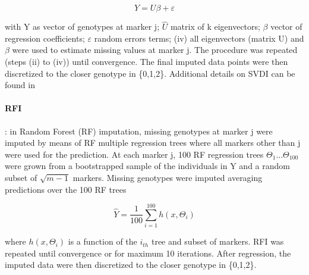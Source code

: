 \begin{equation}
\label{eq:SVDI_regression}
Y = U\beta +\varepsilon 
\end{equation}

with Y as vector of genotypes at marker j; $\hat{U}$ matrix of k eigenvectors; $\beta$ vector of regression coefficients; $\varepsilon$ random errors terms; (iv) all eigenvectors (matrix U) and $\beta$ were used to estimate missing values at marker j. The procedure was repeated (steps (ii) to (iv)) until convergence. The final imputed data points were then discretized to the closer genotype in \{0,1,2\}. Additional details on SVDI can be found in \cite{troyanskaya_missing_2001}

\paragraph{RFI}
\label{par:RFI}
: in Random Forest (RF) imputation, missing genotypes at marker j were imputed by means of RF multiple regression trees \cite{breiman_random_2001} where all markers other than j were used for the prediction. At each marker j, 100 RF regression trees $\Theta_{1} \ldots \Theta_{100}$ were grown from a bootstrapped sample of the individuals in Y and a random subset of $\sqrt{m-1}$ markers. Missing genotypes were imputed averaging predictions over the 100 RF trees

\begin{equation}
\label{eq:RFI_regression}
\hat{Y} = \frac{1}{100}\sum_{i=1}^{100} h(x,\Theta_i)
\end{equation}

where $h(x,\Theta_i)$ is a function of the $i_{th}$ tree and subset of markers. RFI was repeated until convergence or for maximum 10 iterations. After regression, the imputed data were then discretized to the closer genotype in \{0,1,2\}. 

